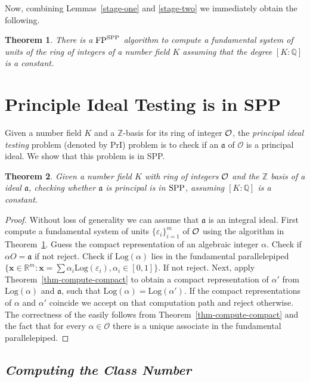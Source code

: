 \documentclass{article}
\newcommand{\Log}[1]{\mathrm{Log}\left(#1\right)}
\renewcommand{\O}{\mathcal{O}}
\newcommand{\Ideal}[1]{\ensuremath{\mathfrak{#1}}}
\newcommand{\FP}{{\rm FP}}
\newcommand{\SPP}{{\rm SPP}}
\newtheorem{theorem}{Theorem}[section]
\theoremstyle{definition}\newtheorem{remark}[theorem]{Remark}
\renewcommand{\vector}[1]{\ensuremath{\mathbf{#1}}}
\begin{document}
Now, combining Lemmas~\ref{stage-one} and \ref{stage-two} we
immediately obtain the following.

\begin{theorem}\label{thm-units-compute}
  There is a $\FP^{\SPP}$ algorithm to compute a fundamental system of
  units of the ring of integers of a number field $K$ assuming that
  the degree $[K:\mathbb{Q}]$ is a constant.
\end{theorem}


\section{Principle Ideal Testing is in SPP}\label{six}

Given a number field $K$ and a $\mathbb{Z}$-basis for its ring of
integer $\cal O$, the \emph{principal ideal testing} problem (denoted
by PrI) problem is to check if an $\Ideal{a}$ of $\O$ is a principal
ideal. We show that this problem is in SPP.

\begin{theorem}\label{pri-test}
  Given a number field $K$ with ring of integers $\cal O$ and the
  $\mathbb{Z}$ basis of a ideal $\Ideal{a}$, checking whether
  $\Ideal{a}$ is principal is in $\SPP$, assuming $[K : \mathbb{Q}]$
  is a constant.
\end{theorem}
\begin{proof}
  Without loss of generality we can assume that $\Ideal{a}$ is an
  integral ideal. First compute a fundamental system of units $\{
  \varepsilon_i \}_{i=1}^m$ of $\cal O$ using the algorithm in
  Theorem~\ref{thm-units-compute}. Guess the compact representation of
  an algebraic integer $\alpha$. Check if $\alpha O = \Ideal{a}$ if
  not reject.  Check if $\Log{\alpha}$ lies in the fundamental
  parallelepiped $\{ \vector{x} \in \mathbb{R}^m : \vector{x} = \sum
  \alpha_i \Log{\varepsilon_i} , \alpha_i \in [0,1] \}$. If not
  reject. Next, apply Theorem~\ref{thm-compute-compact} to obtain a
  compact representation of $\alpha'$ from $\Log{\alpha}$ and
  $\Ideal{a}$, such that $\Log{\alpha}=\Log{\alpha'}$. If the compact
  representations of $\alpha$ and $\alpha'$ coincide we accept on
  that computation path and reject otherwise. The correctness of the
  easily follows from Theorem~\ref{thm-compute-compact} and the fact
  that for every $\alpha\in\O$ there is a unique associate in the
  fundamental parallelepiped.
\end{proof}

\subsection{\it Computing the Class Number}
\end{document}
